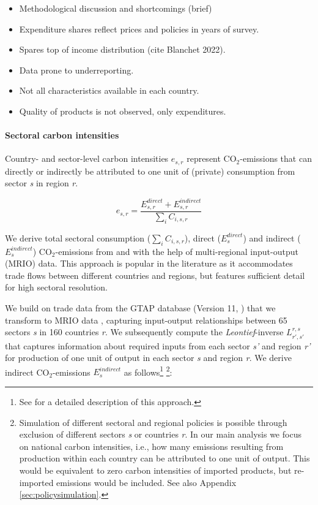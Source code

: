 \documentclass[12pt, a4paper]{article}
\begin{document}
\begin{itemize}
    \item Methodological discussion and shortcomings (brief)
    \item Expenditure shares reflect prices and policies in years of survey. 
    \item Spares top of income distribution (cite Blanchet 2022).
    \item Data prone to underreporting.
    \item Not all characteristics available in each country.
    \item Quality of products is not observed, only expenditures. 
\end{itemize}


\paragraph{Sectoral carbon intensities} Country- and sector-level carbon intensities $e_{s,r}$ represent CO$_{2}$-emissions that can directly or indirectly be attributed to one unit of (private) consumption from sector \textit{s} in region \textit{r}.

\begin{equation}
    e_{s,r} = \frac{E_{s,r}^{direct}+E_{s,r}^{indirect}}{\sum_{i} C_{i,s,r}}
\end{equation}

We derive total sectoral consumption ($\sum_{i} C_{i,s,r}$), direct ($E_{s}^{direct}$) and indirect ($E_{s}^{indirect}$) CO$_{2}$-emissions from and with the help of multi-regional input-output (MRIO) data. This approach is popular in the literature as it accommodates trade flows between different countries and regions, but features sufficient detail for high sectoral resolution. 

We build on trade data from the GTAP database (Version 11,  \textcite{Aguiar.2022}) that we transform to MRIO data \autocite{Peters.2011}, capturing input-output relationships between 65 sectors \textit{s} in 160 countries \textit{r}. We subsequently compute the \textit{Leontief}-inverse $L_{r',s'}^{r,s}$ that captures information about required inputs from each sector \textit{s'} and region \textit{r'} for production of one unit of output in each sector \textit{s} and region \textit{r}. We derive indirect CO$_{2}$-emissions $E_{s}^{indirect}$ as follows\footnote{See \textcite{Missbach.2023b, Steckel.2021b,Feindt.2021,VogtSchilb.2019} for a detailed description of this approach.} \footnote{Simulation of different sectoral and regional policies is possible through exclusion of different sectors \textit{s} or countries \textit{r}. In our main analysis we focus on national carbon intensities, i.e., how many emissions resulting from production within each country can be attributed to one unit of output. This would be equivalent to zero carbon intensities of imported products, but re-imported emissions would be included. See also Appendix \ref{sec:policysimulation}.}:
\end{document}
